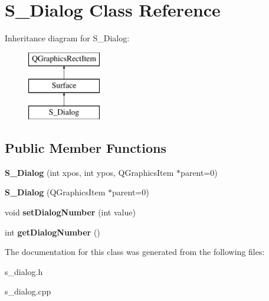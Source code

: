 \hypertarget{class_s___dialog}{}\section{S\+\_\+\+Dialog Class Reference}
\label{class_s___dialog}
Inheritance diagram for S\+\_\+\+Dialog\+:\begin{figure}[H]
\begin{center}
\leavevmode
\includegraphics[height=3.000000cm]{class_s___dialog}
\end{center}
\end{figure}
\subsection*{Public Member Functions}
\begin{DoxyCompactItemize}
\item 
\hypertarget{class_s___dialog_a9b20a59ab0954ef8d9befdfbb556e398}{}{\bfseries S\+\_\+\+Dialog} (int xpos, int ypos, Q\+Graphics\+Item $\ast$parent=0)\label{class_s___dialog_a9b20a59ab0954ef8d9befdfbb556e398}

\item 
\hypertarget{class_s___dialog_a1694750fe7501bc3cd20eb97e1e3384f}{}{\bfseries S\+\_\+\+Dialog} (Q\+Graphics\+Item $\ast$parent=0)\label{class_s___dialog_a1694750fe7501bc3cd20eb97e1e3384f}

\item 
\hypertarget{class_s___dialog_a139b0eb3a98042192ac78df37806f1ad}{}void {\bfseries set\+Dialog\+Number} (int value)\label{class_s___dialog_a139b0eb3a98042192ac78df37806f1ad}

\item 
\hypertarget{class_s___dialog_ad26a628ae1d62d07e1b226126b04814f}{}int {\bfseries get\+Dialog\+Number} ()\label{class_s___dialog_ad26a628ae1d62d07e1b226126b04814f}

\end{DoxyCompactItemize}


The documentation for this class was generated from the following files\+:\begin{DoxyCompactItemize}
\item 
s\+\_\+dialog.\+h\item 
s\+\_\+dialog.\+cpp\end{DoxyCompactItemize}
